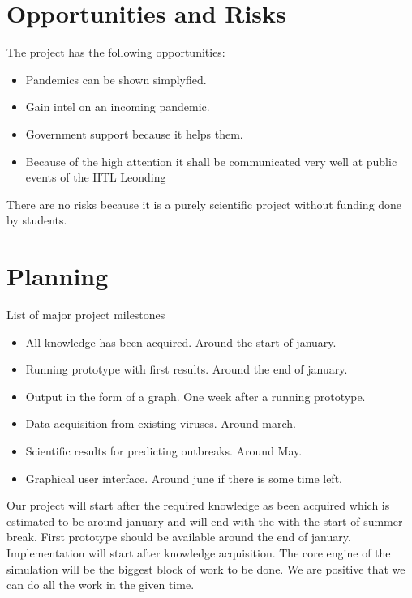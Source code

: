 \documentclass[12pt]{article}
\theoremstyle{definition}
\begin{document}
\pagebreak
\section{Opportunities and Risks}

The project has the following opportunities:
\begin{itemize}
\item Pandemics can be shown simplyfied.
\item Gain intel on an incoming pandemic.
\item Government support because it helps them.
\item Because of the high attention it shall be communicated very well at public events of the HTL Leonding
\end{itemize}

There are no risks because it is a purely scientific project without funding done by students.

\pagebreak
\section{Planning}

List of major project milestones
\begin{itemize}
\item All knowledge has been acquired. Around the start of january.
\item Running prototype with first results. Around the end of january.
\item Output in the form of a graph. One week after a running prototype.
\item Data acquisition from existing viruses. Around march.
\item Scientific results for predicting outbreaks. Around May.
\item Graphical user interface. Around june if there is some time left.
\end{itemize}

Our project will start after the required knowledge as been acquired which is estimated to be around january and will end with the with the start of summer break.
First prototype should be available around the end of january.
Implementation will start after knowledge acquisition.
The core engine of the simulation will be the biggest block of work to be done.
We are positive that we can do all the work in the given time.
\end{document}
